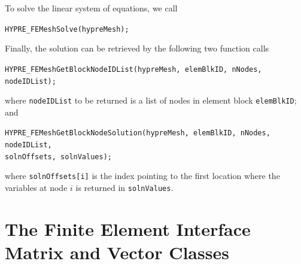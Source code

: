 To solve the linear system of equations, we call
\begin{tabbing}
\hspace{0.5in} \= {\tt HYPRE\_FEMeshSolve(hypreMesh);}
\end{tabbing}
Finally, the solution can be retrieved by the following two function calls
\begin{tabbing}
\hspace{0.5in} \= {\tt HYPRE\_FEMeshGetBlockNodeIDList(hypreMesh, elemBlkID, nNodes, nodeIDList);}
\end{tabbing}
where {\tt nodeIDList} to be returned is a list of nodes in element 
block {\tt elemBlkID}; and
\begin{tabbing}
\hspace{0.5in} \= {\tt HYPRE\_FEMeshGetBlockNodeSolution(hypreMesh, elemBlkID, nNodes, nodeIDList,}\\
\> \hspace{1.0in} {\tt solnOffsets, solnValues);}
\end{tabbing}
where {\tt solnOffsets[i]} is the index pointing to the first location 
where the variables at node $i$ is returned in {\tt solnValues}.

\section{The Finite Element Interface Matrix and Vector Classes}

